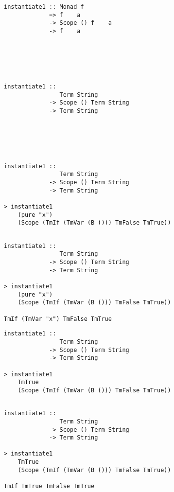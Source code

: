 \documentclass[aspectration=169]{beamer}
\begin{document}
\begin{frame}[fragile]
  \begin{overprint}
  \begin{verbatim}
instantiate1 :: Monad f 
             => f    a 
             -> Scope () f    a 
             -> f    a 






  \end{verbatim}  
  \begin{verbatim}
instantiate1 :: 
                Term String 
             -> Scope () Term String 
             -> Term String






  \end{verbatim}  
  \begin{verbatim}
instantiate1 :: 
                Term String 
             -> Scope () Term String 
             -> Term String

> instantiate1 
    (pure "x") 
    (Scope (TmIf (TmVar (B ())) TmFalse TmTrue))


  \end{verbatim}  
  \begin{verbatim}
instantiate1 :: 
                Term String 
             -> Scope () Term String 
             -> Term String

> instantiate1 
    (pure "x") 
    (Scope (TmIf (TmVar (B ())) TmFalse TmTrue))

TmIf (TmVar "x") TmFalse TmTrue
  \end{verbatim}  
  \begin{verbatim}
instantiate1 :: 
                Term String 
             -> Scope () Term String 
             -> Term String

> instantiate1 
    TmTrue 
    (Scope (TmIf (TmVar (B ())) TmFalse TmTrue))


  \end{verbatim}  
  \begin{verbatim}
instantiate1 :: 
                Term String 
             -> Scope () Term String 
             -> Term String

> instantiate1 
    TmTrue 
    (Scope (TmIf (TmVar (B ())) TmFalse TmTrue))

TmIf TmTrue TmFalse TmTrue
  \end{verbatim}  
  \end{overprint}
\end{frame}
\end{document}
